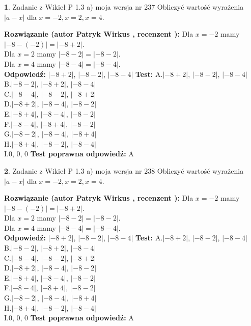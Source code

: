 \documentclass[12pt, a4paper]{article}
\theoremstyle{definition} %
\newtheorem{zad}{}
\newcommand{\zadStart}[1]{\begin{zad}#1\newline}
\newcommand{\zadStop}{\end{zad}}
\newcommand{\rozwStart}[2]{\noindent \textbf{Rozwiązanie (autor #1 , recenzent #2): }\newline}
\newcommand{\rozwStop}{\newline}
\newcommand{\odpStart}{\noindent \textbf{Odpowiedź:}\newline}
\newcommand{\odpStop}{\newline}
\newcommand{\testStart}{\noindent \textbf{Test:}\newline}
\newcommand{\testStop}{\newline}
\newcommand{\kluczStart}{\noindent \textbf{Test poprawna odpowiedź:}\newline}
\newcommand{\kluczStop}{\newline}
\begin{document}
\zadStart{Zadanie z Wikieł P 1.3 a) moja wersja nr 237}
Obliczyć wartość wyrażenia $|a - x|$ dla $x=-2,x=2,x=4$.
\zadStop
\rozwStart{Patryk Wirkus}{}
Dla $x = -2$ mamy $|-8 - (-2)| = |-8 + 2|$.\\
Dla $x = 2$ mamy $|-8 - 2| = |-8 - 2|$.\\
Dla $x = 4$ mamy $|-8 - 4| = |-8 - 4|$.\\
\rozwStop
\odpStart
$|-8 + 2|$, $|-8 - 2|$, $|-8 - 4|$
\odpStop
\testStart
A.$|-8 + 2|$, $|-8 - 2|$, $|-8 - 4|$\\
B.$|-8 - 2|$, $|-8 + 2|$, $|-8 - 4|$\\
C.$|-8 - 4|$, $|-8 - 2|$, $|-8 + 2|$\\
D.$|-8 + 2|$, $|-8 - 4|$, $|-8 - 2|$\\
E.$|-8 + 4|$, $|-8 - 4|$, $|-8 - 2|$\\
F.$|-8 - 4|$, $|-8 + 4|$, $|-8 - 2|$\\
G.$|-8 - 2|$, $|-8 - 4|$, $|-8 + 4|$\\
H.$|-8 + 4|$, $|-8 - 2|$, $|-8 - 4|$\\
I.$0$, $0$, $0$
\testStop
\kluczStart
A
\kluczStop



\zadStart{Zadanie z Wikieł P 1.3 a) moja wersja nr 238}
Obliczyć wartość wyrażenia $|a - x|$ dla $x=-2,x=2,x=4$.
\zadStop
\rozwStart{Patryk Wirkus}{}
Dla $x = -2$ mamy $|-8 - (-2)| = |-8 + 2|$.\\
Dla $x = 2$ mamy $|-8 - 2| = |-8 - 2|$.\\
Dla $x = 4$ mamy $|-8 - 4| = |-8 - 4|$.\\
\rozwStop
\odpStart
$|-8 + 2|$, $|-8 - 2|$, $|-8 - 4|$
\odpStop
\testStart
A.$|-8 + 2|$, $|-8 - 2|$, $|-8 - 4|$\\
B.$|-8 - 2|$, $|-8 + 2|$, $|-8 - 4|$\\
C.$|-8 - 4|$, $|-8 - 2|$, $|-8 + 2|$\\
D.$|-8 + 2|$, $|-8 - 4|$, $|-8 - 2|$\\
E.$|-8 + 4|$, $|-8 - 4|$, $|-8 - 2|$\\
F.$|-8 - 4|$, $|-8 + 4|$, $|-8 - 2|$\\
G.$|-8 - 2|$, $|-8 - 4|$, $|-8 + 4|$\\
H.$|-8 + 4|$, $|-8 - 2|$, $|-8 - 4|$\\
I.$0$, $0$, $0$
\testStop
\kluczStart
A
\kluczStop
\end{document}
